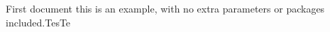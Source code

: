 \documentclass{aritcle}
\begin{document}
First document this is an example, with no
extra parameters or packages included.TesTe
\end{document}
